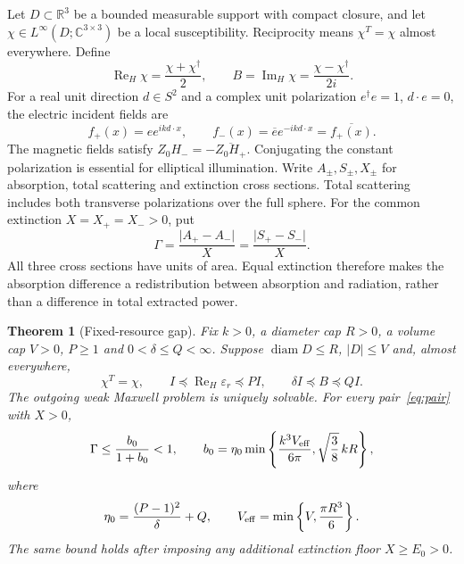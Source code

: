 \documentclass[11pt]{article}
\newtheorem{theorem}{Theorem}[section]
\newcommand{\ReH}{\operatorname{Re}_{\!H}}
\newcommand{\ImH}{\operatorname{Im}_{\!H}}
\newcommand{\abs}[1]{\lvert #1\rvert}
\begin{document}
Let $D\subset\mathbb R^3$ be a bounded measurable support with compact closure, and let $\chi\in L^\infty(D;\mathbb C^{3\times3})$ be a local susceptibility. Reciprocity means $\chi^T=\chi$ almost everywhere. Define
\[
 \ReH\chi=\frac{\chi+\chi^\dagger}{2},\qquad
 B=\ImH\chi=\frac{\chi-\chi^\dagger}{2i}.
\]
For a real unit direction $d\in S^2$ and a complex unit polarization $e^\dagger e=1$, $d\cdot e=0$, the electric incident fields are
\begin{equation}\label{eq:pair}
 f_+(x)=e e^{ikd\cdot x},\qquad
 f_-(x)=\overline e e^{-ikd\cdot x}=\overline{f_+(x)}.
\end{equation}
The magnetic fields satisfy $Z_0H_-=-\overline{Z_0H_+}$. Conjugating the constant polarization is essential for elliptical illumination. Write $A_\pm,S_\pm,X_\pm$ for absorption, total scattering and extinction cross sections. Total scattering includes both transverse polarizations over the full sphere. For the common extinction $X=X_+=X_->0$, put
\begin{equation}\label{eq:gamma}
 \Gamma=\frac{\abs{A_+-A_-}}{X}
       =\frac{\abs{S_+-S_-}}{X}.
\end{equation}
All three cross sections have units of area. Equal extinction therefore makes the absorption difference a redistribution between absorption and radiation, rather than a difference in total extracted power.

\begin{theorem}[Fixed-resource gap]\label{thm:main}
Fix $k>0$, a diameter cap $R>0$, a volume cap $V>0$, $P\geq1$ and $0<\delta\leq Q<\infty$. Suppose $\operatorname{diam}D\leq R$, $\abs D\leq V$ and, almost everywhere,
\begin{equation}\label{eq:material}
 \chi^T=\chi,\qquad
 I\preceq\ReH\varepsilon_r\preceq PI,\qquad
 \delta I\preceq B\preceq QI.
\end{equation}
The outgoing weak Maxwell problem is uniquely solvable. For every pair~\eqref{eq:pair} with $X>0$,
\begin{equation}\label{eq:main}
 \Gamma\leq\frac{b_0}{1+b_0}<1,\qquad
 b_0=\eta_0\min\left\{\frac{k^3V_{\rm eff}}{6\pi},
                          \sqrt{\frac38}\,kR\right\},
\end{equation}
where
\begin{equation}\label{eq:resources}
 \eta_0=\frac{(P-1)^2}{\delta}+Q,\qquad
 V_{\rm eff}=\min\left\{V,\frac{\pi R^3}{6}\right\}.
\end{equation}
The same bound holds after imposing any additional extinction floor $X\geq E_0>0$.
\end{theorem}
\end{document}
